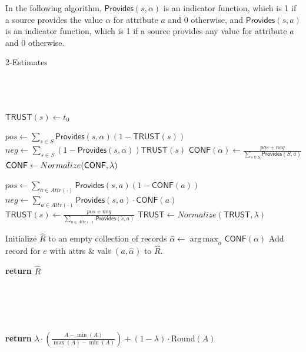 \documentclass{acm_proc_article-sp}
\DeclareMathOperator*{\argmax}{arg\,max}
\begin{document}
In the following algorithm, $\mathsf{Provides}(s,\alpha)$ is an indicator function, which is 1 if a source provides the value $\alpha$ for attribute $a$ and 0 otherwise, and $\mathsf{Provides}(s,a)$ is an indicator function, which is 1 if a source provides any value for attribute $a$ and 0 otherwise. 

\begin{algorithm}[H]
	\small
\caption{2-Estimates}
\label{alg:2e} 
\begin{algorithmic}[1]
	 \\
	 \\
 \\
		\State  $\mathsf{TRUST}(s) \gets t_0$
	\EndFor

			\State $pos \leftarrow \sum_{s\in S} \mathsf{Provides}(s,\alpha){(1- \mathsf{TRUST}(s))}$
			\State $neg \gets \sum_{s\in S} (1-\mathsf{Provides}(s,\alpha)){\mathsf{TRUST}(s)}$
			\State $\mathsf{CONF}(\alpha) \gets \frac{pos + neg}{\sum_{s \in S} \mathsf{Provides}(S,a)}$ 
		\EndFor
	\EndFor
	\State $\mathsf{CONF} \leftarrow {\sc Normalize}(\mathsf{CONF},\lambda)$

		\State $pos \gets \sum_{a\in Attr(\cdot)}{\mathsf{Provides}(s,a)(1- \mathsf{CONF}(a))}$
		\State $neg \gets \sum_{a\in Attr(\cdot)}\mathsf{Provides}(s,a)\cdot{\mathsf{CONF}(a)}$ 
		\State $\mathsf{TRUST}(s) \gets \frac{pos + neg}{\sum_{a\in Attr(\cdot)}{\mathsf{Provides}(s,a)}}$ 
	\EndFor
	\State $\mathsf{TRUST} \gets Normalize(\mathsf{TRUST},\lambda)$

	\State Initialize $\hat{R}$ to an empty collection of records
		\State $\hat{\alpha} \leftarrow \argmax_{\alpha} \mathsf{CONF}(\alpha)$
		\EndFor
		\State Add record for $e$ with attrs \& vals $(a, \hat{\alpha})$ to $\hat{R}$.
	\EndFor

\EndWhile
\State \textbf{return} $\hat{R}$
\EndFunction

 \\

 \\
 \\
 \\

\State \textbf{return} $\lambda \cdot \left (\frac{A - \min(A)}{\max(A)-\min(A)} \right) + (1-\lambda) \cdot ${\sc Round}$( A )$

\EndFunction
\end{algorithmic}
\end{algorithm}  
\end{document}
